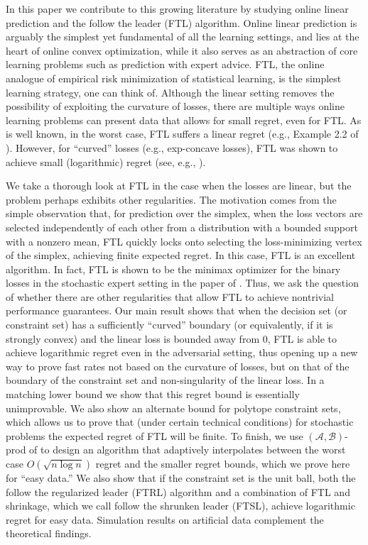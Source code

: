 \documentclass[english]{article}
\newcommand{\cA}{\mathcal{A}}
\newcommand{\cB}{\mathcal{B}}
\begin{document}
In this paper we contribute to this growing literature by studying online linear prediction and the follow the leader (FTL) algorithm.
Online linear prediction is arguably the simplest yet fundamental of all the learning settings, and lies at the heart of online
convex optimization, while it also serves as an abstraction of core learning problems such as prediction with expert advice.
FTL, the online analogue of empirical risk minimization of statistical learning, is the simplest learning strategy, one can think of.
Although the linear setting removes the possibility of exploiting the curvature of losses, there are
multiple ways online learning problems can present data that allows for small regret, even for FTL.
As is well known, in the worst case,
FTL suffers a linear regret (e.g., Example 2.2 of \citealt{SS12:Book}). 
However, for ``curved'' losses (e.g., exp-concave losses), FTL was shown to achieve small (logarithmic) regret
(see, e.g., \citealt{MF92,CBLu06:book,gaivoronski2000stochastic,hazan2007logarithmic}).

We take a thorough look at FTL in the case when the losses are linear, 
but the problem perhaps exhibits other regularities.
The motivation comes from the simple observation that, for prediction over the simplex, when
the loss vectors are selected independently of each other from a distribution with a bounded support with a
nonzero mean, FTL quickly locks onto selecting the loss-minimizing vertex of the simplex, achieving finite expected regret.
In this case, FTL is an excellent algorithm.
In fact, FTL is shown to be the minimax optimizer for the binary losses in the  stochastic expert setting in the paper of \citet{kotlowskiminimax}.
Thus, we ask the question of whether there are other regularities that allow FTL 
to achieve nontrivial performance guarantees.
Our main result shows that when the decision set (or constraint set) has a sufficiently ``curved'' boundary (or equivalently, if it is strongly convex) and the linear loss is bounded away from $0$, FTL 
is able to achieve logarithmic regret even in the adversarial setting, thus opening up a new
way to prove fast rates not based on the curvature of losses, but on that of the boundary of the constraint set and non-singularity of the linear loss.
In a matching lower bound we show that this regret bound is essentially unimprovable.
We also show an alternate bound for polytope constraint sets, which allows us to prove that 
(under certain technical conditions) for stochastic problems the expected regret of FTL will be finite.
To finish, we use $(\cA,\cB)$-prod of \citet{sani2014exploiting} to design an algorithm 
that adaptively interpolates between the worst case $O(\sqrt{n\log n})$ regret and the smaller regret bounds,
which we prove here for ``easy data.'' We also show that if the constraint set is the unit ball, both the follow the regularized leader (FTRL) algorithm and a combination of FTL and shrinkage, which we call follow the shrunken leader (FTSL), achieve logarithmic regret for easy data. Simulation results on artificial data complement the theoretical findings. 
\end{document}
